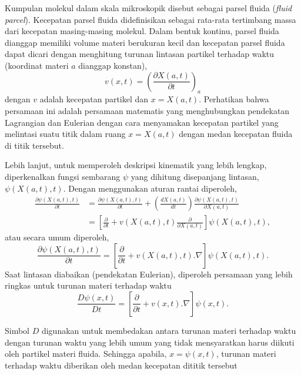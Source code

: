 \begin{spacing}{1.5}
	\par Kumpulan molekul dalam skala mikroskopik disebut sebagai parsel fluida (\textit{fluid parcel}). Kecepatan parsel fluida didefinisikan sebagai rata-rata tertimbang massa dari kecepatan masing-masing molekul. Dalam bentuk kontinu, parsel fluida dianggap memiliki volume materi berukuran kecil dan kecepatan parsel fluida dapat dicari dengan menghitung turunan lintasan partikel terhadap waktu (koordinat materi $a$ dianggap konstan),
	\begin{equation}\label{eq:basic_traj}
		v(x,t) = \left(\frac{\partial X(a,t)}{\partial t}\right)_a
	\end{equation}
	dengan $v$ adalah kecepatan partikel dan $x = X(a,t)$. Perhatikan bahwa persamaan ini adalah persamaan matematis yang menghubungkan pendekatan Lagrangian dan Eulerian dengan cara menyamakan kecepatan partikel yang melintasi suatu titik dalam ruang $x=X(a,t)$ dengan medan kecepatan fluida di titik tersebut.
	\par Lebih lanjut, untuk memperoleh deskripsi kinematik yang lebih lengkap, diperkenalkan fungsi sembarang $\psi$ yang dihitung disepanjang lintasan, $\psi(X(a,t),t)$. Dengan menggunakan aturan rantai diperoleh,
	\begin{equation*}
		\begin{aligned}
		\frac{\partial \psi(X(a,t),t)}{\partial t}&=\frac{\partial \psi(X(a,t),t)}{\partial t} + \left(\frac{dX(a,t)}{dt}\right)\frac{\partial \psi(X(a,t),t)}{\partial X(a,t)}  \\
		&= \left[\frac{\partial}{\partial t} + v(X(a,t),t)\frac{\partial}{\partial X(a,t)}\right]\psi(X(a,t),t),
		\end{aligned}
	\end{equation*}
	atau secara umum diperoleh,
	\begin{equation}
		\frac{\partial \psi(X(a,t),t)}{\partial t}=\left[\frac{\partial}{\partial t}+v(X(a,t),t).\nabla\right]\psi(X(a,t),t).
	\end{equation}
	Saat lintasan diabaikan (pendekatan Eulerian), diperoleh persamaan yang lebih ringkas untuk turunan materi terhadap waktu
	\begin{equation}
		\frac{D \psi(x,t)}{D t}=\left[\frac{\partial}{\partial t}+v(x,t).\nabla\right]\psi(x,t).
	\end{equation}
	\par Simbol $D$ digunakan untuk membedakan antara turunan materi terhadap waktu dengan turunan waktu yang lebih umum yang tidak mensyaratkan harus diikuti oleh partikel materi fluida. Sehingga apabila, $x=\psi(x,t)$, turunan materi terhadap waktu diberikan oleh medan kecepatan dititik tersebut

\end{spacing}
